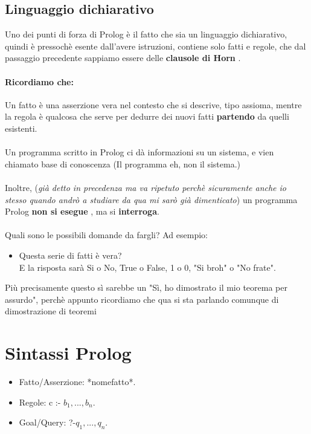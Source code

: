 \documentclass[12pt, a4paper, openany, oneside]{book}
\begin{document}
{\subsection{Linguaggio dichiarativo}
Uno dei punti di forza di Prolog è il fatto che sia un linguaggio dichiarativo,
quindi è pressochè esente dall'avere istruzioni, contiene solo fatti e regole,
che dal passaggio precedente sappiamo essere delle \color{blue} 
\textbf{clausole di Horn} \color{black}. 
\paragraph{Ricordiamo che: } Un fatto è una asserzione vera nel contesto che si 
descrive, tipo assioma, mentre la regola è qualcosa che serve per dedurre dei 
nuovi fatti \textbf{partendo} da quelli esistenti. \\ \\
Un programma scritto in Prolog ci dà informazioni su un sistema, e vien chiamato
\color{red} base di conoscenza \color{black} (Il programma eh, non il sistema.)
\\ \\
Inoltre, (\textit{già detto in precedenza ma va ripetuto perchè sicuramente anche io 
stesso quando andrò a studiare da qua mi sarò già dimenticato}) un programma 
Prolog \color{red} \textbf{non si esegue} \color{black}, ma si \textbf{interroga}.
\\ \\
Quali sono le possibili domande da fargli? Ad esempio:
\begin{itemize}
	\item Questa serie di fatti è vera? \\
	E la risposta sarà \color{britishracinggreen}Si \color{black} o \color{red}No, 
	\color{britishracinggreen}True \color{black} o \color{red}False, \color{britishracinggreen}1
	\color{black} o \color{red}0, \color{britishracinggreen}"Si broh" \color{black} o 
	\color{red}"No frate".
\end{itemize}
Più precisamente questo sì sarebbe un "Sì, ho dimostrato il mio teorema per 
assurdo", perchè appunto ricordiamo che qua si sta parlando comunque di 
dimostrazione di teoremi
\section{Sintassi Prolog}
\begin{itemize}
	\item Fatto/Asserzione: *nomefatto*. 
	\item Regole: c :- $b_{1}, ..., b_{n}$.
	\item Goal/Query: ?-$q_{1}, ..., q_{n}$.

\end{itemize}}
\end{document}
